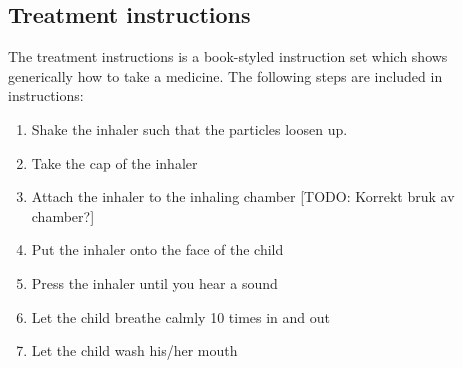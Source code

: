 \subsection{Treatment instructions}
\label{sec:description-instructions}
The treatment instructions is a book-styled instruction set which shows generically how to take a medicine. 
The following steps are included in instructions: 
\begin{enumerate}
  \item Shake the inhaler such that the particles loosen up. 
  \item Take the cap of the inhaler
  \item Attach the inhaler to the inhaling chamber [TODO: Korrekt bruk av chamber?]
  \item Put the inhaler onto the face of the child
  \item Press the inhaler until you hear a sound
  \item Let the child breathe calmly 10 times in and out
  \item Let the child wash his/her mouth
\end{enumerate} 



